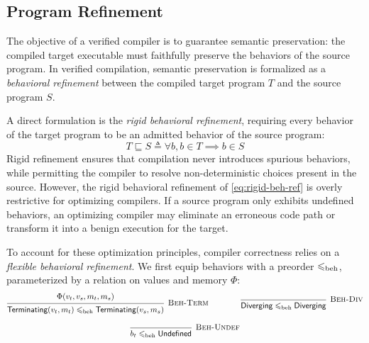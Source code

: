 \documentclass[report.tex]{subfiles}
\begin{document}
\subsection{Program Refinement}

The objective of a verified compiler is to guarantee semantic preservation:
the compiled target executable must faithfully preserve
the behaviors of the source program.
In verified compilation,
semantic preservation is formalized as a \emph{behavioral refinement}
between the compiled target program $T$ and the source program $S$.

A direct formulation is the \emph{rigid behavioral refinement},
requiring every behavior of the target program
to be an admitted behavior of the source program:
\begin{equation}
  \label{eq:rigid-beh-ref}
  T \sqsubseteq S \triangleq \forall b, b \in T \implies b \in S
\end{equation}
Rigid refinement ensures that compilation never introduces spurious behaviors,
while permitting the compiler to resolve non-deterministic choices
present in the source.
However,
the rigid behavioral refinement of \cref{eq:rigid-beh-ref}
is overly restrictive for optimizing compilers.
If a source program only exhibits undefined behaviors,
an optimizing compiler may eliminate an erroneous code path
or transform it into a benign execution for the target.

To account for these optimization principles,
compiler correctness relies on a \emph{flexible behavioral refinement}.
We first equip behaviors with a preorder $\leqslant_{\text{beh}}$,
parameterized by a relation on values and memory $\Phi$:
\begin{gather*}
  \begin{prooftree}
    \hypo{\Phi(v_t, v_s, m_t, m_s)}
    \infer1[\textsc{Beh-Term}]{
      \Term{v_t, m_t} \behord \Term{v_s, m_s}
    }
  \end{prooftree}
  \qquad\qquad
  \begin{prooftree}
    \hypo{}
    \infer1[\textsc{Beh-Div}]{
      \Div \behord \Div
    }
  \end{prooftree}
  \\[1em]
  \begin{prooftree}
    \hypo{}
    \infer1[\textsc{Beh-Undef}]{
      b_t \behord \Undef
    }
  \end{prooftree}
\end{gather*}
\end{document}
